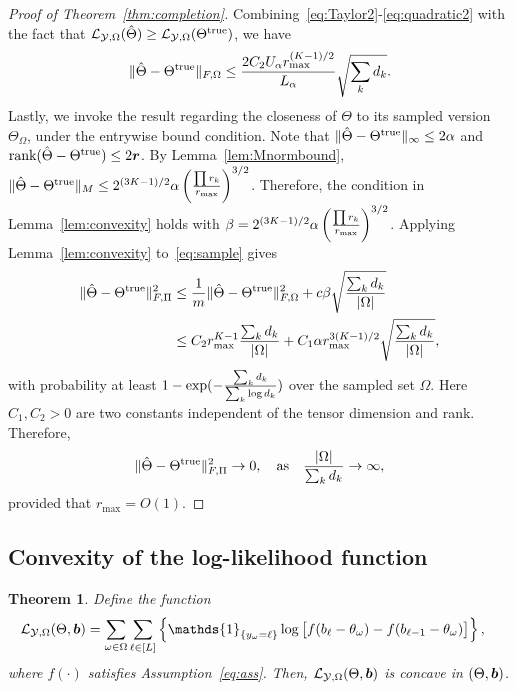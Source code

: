 \documentclass[11pt]{article}
\theoremstyle{plain}
\newtheorem{thm}{Theorem}[section]
\theoremstyle{definition}
\begin{document}
\begin{proof}[Proof of Theorem~\ref{thm:completion}]
Combining~\eqref{eq:Taylor2}-\eqref{eq:quadratic2} with the fact that $\mathcal{L}_{\mathcal{Y},\Omega}(\hat \Theta)\geq \mathcal{L}_{\mathcal{Y},\Omega}(\Theta^{\mathrm{true}})$, we have
\begin{equation}\label{eq:sample}
\lVert\hat \Theta-\Theta^{\mathrm{true}}\rVert_{F,\Omega}\leq {2C_2U_\alpha  r_{\max}^{(K-1)/2} \over L_\alpha} \sqrt{\sum_kd_k}.
\end{equation}
Lastly, we invoke the result regarding the closeness of $\Theta$ to its sampled version $\Theta_{\Omega}$, under the entrywise bound condition. Note that $\lVert\hat\Theta-\Theta^{\mathrm{true}}\rVert_\infty\leq 2\alpha$ and $\text{rank}(\hat \Theta-\Theta^{\mathrm{true}})\leq 2\bm{r}$. By Lemma~\ref{lem:Mnormbound}, $\lVert\hat \Theta-\Theta^{\mathrm{true}}\rVert_M\leq 2^{(3K-1)/2} \alpha \left({\prod r_k \over r_{\max}}\right)^{3/2}$. Therefore, the condition in Lemma~\ref{lem:convexity} holds with $\beta=2^{(3K-1)/2}\alpha \left({\prod r_k \over r_{\max}}\right)^{3/2}$.
Applying Lemma~\ref{lem:convexity} to~\eqref{eq:sample} gives
\begin{align}
 \lVert\hat \Theta-\Theta^{\mathrm{true}}\rVert_{F,\Pi}^2&\leq {1\over m}\lVert\hat \Theta-\Theta^{\mathrm{true}}\rVert_{F,\Omega}^2+c\beta\sqrt{\sum_k d_k\over |\Omega|}\\
 &\leq {C_2  r^{K-1}_{\max}} {\sum_k d_k \over |\Omega|}+C_1 \alpha r_{\max}^{3(K-1)/2}\sqrt{\sum_kd_k\over |\Omega|},
\end{align}
with probability at least $1-\exp(-{\sum_kd_k\over \sum_k \log d_k})$ over the sampled set $\Omega$. Here $C_1, C_2>0$ are two constants independent of the tensor dimension and rank. Therefore,
\[
 \lVert\hat \Theta-\Theta^{\mathrm{true}}\rVert_{F,\Pi}^2\to 0,\quad \text{as}\quad {|\Omega|\over \sum_kd_k}\to \infty,
\]
provided that $r_{\max}=O(1)$.
\end{proof}

\subsection{Convexity of the log-likelihood function}
\begin{thm}\label{thm:convexity}
Define the function
\begin{align}\label{eq:function}
 \logl(\Theta, \mb)&=\sum_{\omega\in\Omega}\sum_{\ell\in[L]} \left\{\mathds{1}_{\{y_\omega=\ell\}} \log \big[f(b_\ell-\theta_\omega)-  f(b_{\ell-1}-\theta_\omega)\big]\right\},
 \end{align}
where $f(\cdot)$ satisfies Assumption~\eqref{eq:ass}. Then, $\mathcal{L}_{\mathcal{Y},\Omega}(\Theta, \bm{b})$ is concave in $(\Theta,\bm{b})$.
\end{thm}
\end{document}
